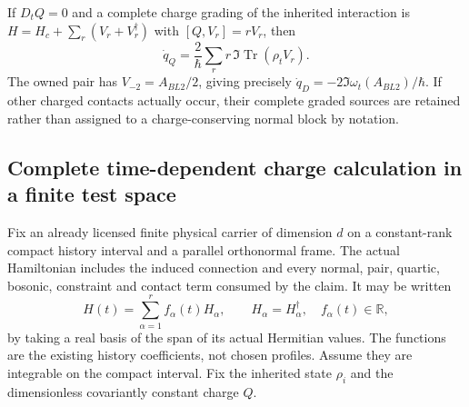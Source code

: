 \documentclass[12pt,a4paper]{article}
\begin{document}
If $D_tQ=0$ and a complete charge grading of the inherited interaction is
$H=H_c+\sum_r(V_r+V_r^\dagger)$ with $[Q,V_r]=rV_r$, then
\begin{equation}
 \dot q_Q=\frac{2}{\hbar}\sum_r r\,
                      \Im\operatorname{Tr}(\rho_tV_r).
 \label{p4:v2171:eq:gradedsource}
\end{equation}
The owned pair has $V_{-2}=A_{BL2}/2$, giving precisely
$\dot q_D=-2\Im\omega_t(A_{BL2})/\hbar$. If other charged contacts
actually occur, their complete graded sources are retained rather than
assigned to a charge-conserving normal block by notation.



\subsection{Complete time-dependent charge calculation in a finite test space}
Fix an already licensed finite physical carrier of dimension $d$ on a
constant-rank compact history interval and a parallel orthonormal frame.
The actual Hamiltonian includes the induced connection and every normal,
pair, quartic, bosonic, constraint and contact term consumed by the claim.
It may be written
\[
 H(t)=\sum_{\alpha=1}^{r}f_\alpha(t)H_\alpha,
 \qquad H_\alpha=H_\alpha^\dagger,\quad f_\alpha(t)\in\mathbb R,
\]
by taking a real basis of the span of its actual Hermitian values.
The functions are the existing history coefficients, not chosen profiles.
Assume they are integrable on the compact interval. Fix the inherited state
$\rho_i$ and the dimensionless covariantly constant charge $Q$.
\end{document}
